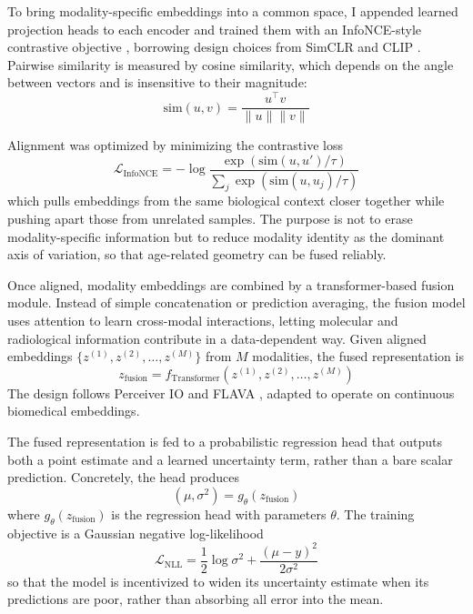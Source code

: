 \documentclass[10pt,twocolumn]{article}
\begin{document}
To bring modality-specific embeddings into a common space, I appended learned projection heads
to each encoder and trained them with an InfoNCE-style contrastive objective \cite{oord2018cpc},
borrowing design choices from SimCLR and CLIP \cite{chen2020simclr,radford2021clip}. Pairwise
similarity is measured by cosine similarity, which depends on the angle between vectors and is
insensitive to their magnitude:
\begin{equation}
\mathrm{sim}(u, v) = \frac{u^\top v}{\|u\| \|v\|}
\label{eq:cosine}
\end{equation}

Alignment was optimized by minimizing the contrastive loss
\begin{equation}
\mathcal{L}_{\text{InfoNCE}}
=
- \log
\frac{\exp(\mathrm{sim}(u,u') / \tau)}
{\sum_{j} \exp(\mathrm{sim}(u,u_j)/\tau)}
\label{eq:infonce}
\end{equation}
which pulls embeddings from the same biological context closer together while pushing apart
those from unrelated samples. The purpose is not to erase modality-specific information but to
reduce modality identity as the dominant axis of variation, so that age-related geometry can be
fused reliably.

Once aligned, modality embeddings are combined by a transformer-based fusion module. Instead of
simple concatenation or prediction averaging, the fusion model uses attention to learn cross-modal
interactions, letting molecular and radiological information contribute in a data-dependent way.
Given aligned embeddings $\{z^{(1)}, z^{(2)}, \dots, z^{(M)}\}$ from $M$ modalities, the fused
representation is
\begin{equation}
z_{\text{fusion}} = f_{\text{Transformer}}\left(
z^{(1)}, z^{(2)}, \dots, z^{(M)}
\right)
\label{eq:fusion}
\end{equation}
The design follows Perceiver IO and FLAVA \cite{jaegle2021perceiver,singh2021flava}, adapted to
operate on continuous biomedical embeddings.

The fused representation is fed to a probabilistic regression head that outputs both a point
estimate and a learned uncertainty term, rather than a bare scalar prediction. Concretely, the
head produces
\begin{equation}
(\mu, \sigma^2) = g_{\theta}(z_{\text{fusion}})
\label{eq:age_prediction}
\end{equation}
where $g_{\theta}(z_{\text{fusion}})$ is the regression head with parameters $\theta$. The
training objective is a Gaussian negative log-likelihood \cite{kendall2017}
\begin{equation}
\mathcal{L}_{\text{NLL}}
=
\frac{1}{2}\log\sigma^2
+
\frac{(\mu-y)^2}{2\sigma^2}
\label{eq:gnll}
\end{equation}
so that the model is incentivized to widen its uncertainty estimate when its predictions are
poor, rather than absorbing all error into the mean.
\end{document}
